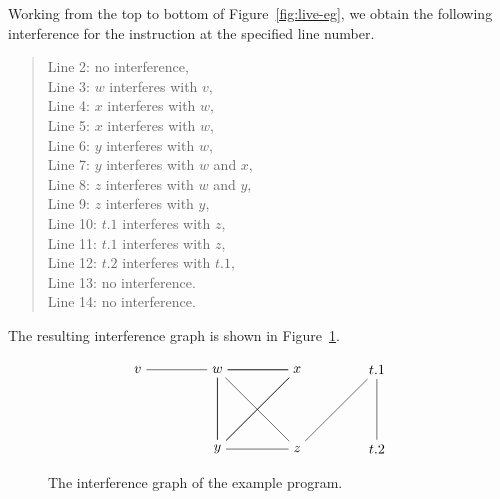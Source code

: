 \documentclass[11pt]{book}
\begin{document}
Working from the top to bottom of Figure~\ref{fig:live-eg}, we obtain
the following interference for the instruction at the specified line
number.
\begin{quote}
Line 2: no interference,\\
Line 3: $w$ interferes with $v$,\\
Line 4: $x$ interferes with $w$,\\
Line 5: $x$ interferes with $w$,\\
Line 6: $y$ interferes with $w$,\\
Line 7: $y$ interferes with $w$ and $x$,\\
Line 8: $z$ interferes with $w$ and $y$,\\
Line 9: $z$ interferes with $y$, \\
Line 10: $t.1$ interferes with $z$, \\
Line 11: $t.1$ interferes with $z$, \\
Line 12: $t.2$ interferes with $t.1$, \\
Line 13: no interference. \\
Line 14: no interference.
\end{quote}
The resulting interference graph is shown in
Figure~\ref{fig:interfere}.

\begin{figure}[tbp]
\large
\[
\begin{tikzpicture}[baseline=(current  bounding  box.center)]
\node (v) at (0,0)   {$v$};
\node (w) at (2,0)   {$w$};
\node (x) at (4,0)   {$x$};
\node (t1) at (6,0)   {$t.1$};
\node (y) at (2,-2)  {$y$};
\node (z) at (4,-2)  {$z$};
\node (t2) at (6,-2) {$t.2$};

\draw (v) to (w);
\foreach \i in {w,x,y}
{
  \foreach \j in {w,x,y}
  {
    \draw (\i) to (\j);
  }
}
\draw (z) to (w);
\draw (z) to (y);
\draw (t1) to (z);
\draw (t2) to (t1);
\end{tikzpicture}
\]
\caption{The interference graph of the example program.}
\label{fig:interfere}
\end{figure}
\end{document}
